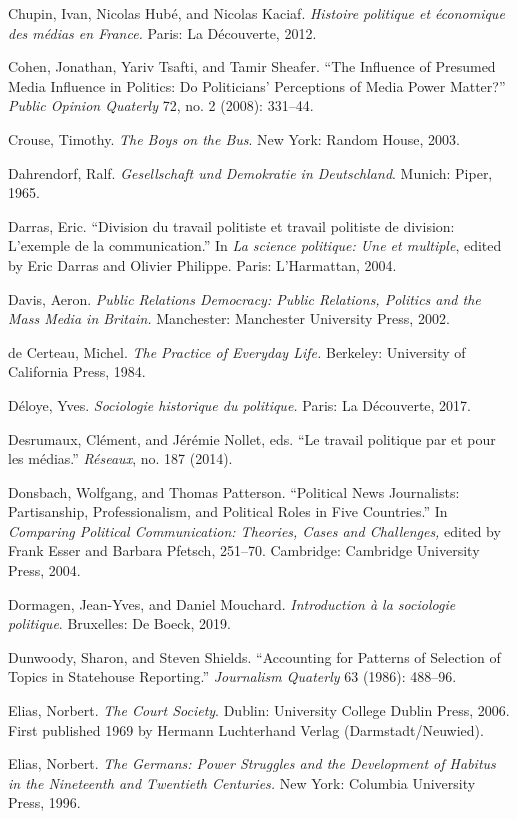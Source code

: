 \documentclass{tufte-handout}
\begin{document}
\begin{hangparas}{.25in}{1}
Chupin, Ivan, Nicolas Hubé, and Nicolas Kaciaf. \emph{Histoire politique
et économique des médias en France.} Paris: La Découverte, 2012.

Cohen, Jonathan, Yariv Tsafti, and Tamir Sheafer. ``The Influence of
Presumed Media Influence in Politics: Do Politicians' Perceptions of
Media Power Matter?'' \emph{Public Opinion Quaterly} 72, no. 2 (2008):
331--44.

Crouse, Timothy. \emph{The Boys on the Bus}. New York: Random House,
2003.

Dahrendorf, Ralf. \emph{Gesellschaft und Demokratie in Deutschland}.
Munich: Piper, 1965.

Darras, Eric. ``Division du travail politiste et travail politiste de
division: L'exemple de la communication.'' In \emph{La science
politique: Une et multiple}, edited by Eric Darras and Olivier Philippe.
Paris: L'Harmattan, 2004.

Davis, Aeron. \emph{Public Relations Democracy: Public Relations,
Politics and the Mass Media in Britain.} Manchester: Manchester
University Press, 2002.

de Certeau, Michel. \emph{The Practice of Everyday Life.} Berkeley:
University of California Press, 1984.

Déloye, Yves. \emph{Sociologie historique du politique.} Paris: La
Découverte, 2017.

Desrumaux, Clément, and Jérémie Nollet, eds. ``Le travail politique par
et pour les médias.'' \emph{Réseaux}, no. 187 (2014).

Donsbach, Wolfgang, and Thomas Patterson. ``Political News Journalists:
Partisanship, Professionalism, and Political Roles in Five Countries.''
In \emph{Comparing Political Communication: Theories, Cases and
Challenges,} edited by Frank Esser and Barbara Pfetsch, 251--70.
Cambridge: Cambridge University Press, 2004.

Dormagen, Jean-Yves, and Daniel Mouchard. \emph{Introduction à la
sociologie politique}. Bruxelles: De Boeck, 2019.

Dunwoody, Sharon, and Steven Shields. ``Accounting for Patterns of
Selection of Topics in Statehouse Reporting.'' \emph{Journalism
Quaterly} 63 (1986): 488--96.

Elias, Norbert. \emph{The Court Society}. Dublin: University College
Dublin Press, 2006. First published 1969 by Hermann Luchterhand Verlag
(Darmstadt/Neuwied).

Elias, Norbert. \emph{The Germans: Power Struggles and the Development
of Habitus in the Nineteenth and Twentieth Centuries.} New York:
Columbia University Press, 1996.


\end{hangparas}
\end{document}

